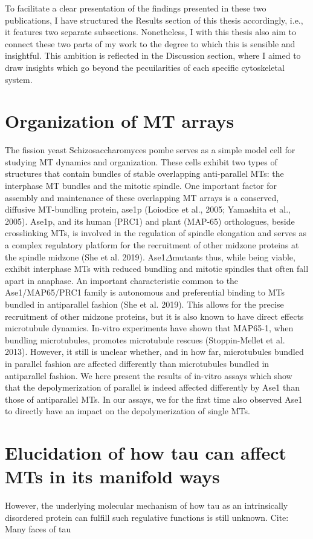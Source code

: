 To facilitate a clear presentation of the findings presented in these two publications, I have structured the Results section of this thesis accordingly, i.e., it features two separate subsections. Nonetheless, I with this thesis also aim to connect these two parts of my work to the degree to which this is sensible and insightful. This ambition is reflected in the Discussion section, where I aimed to draw insights which go beyond the pecuilarities of each specific cytoskeletal system.


\section{Organization of MT arrays}
The fission yeast Schizosaccharomyces pombe serves as a simple model cell for studying MT dynamics and organization. These cells exhibit two types of structures that contain bundles of stable overlapping anti-parallel MTs: the interphase MT bundles and the mitotic spindle. One important factor for assembly and maintenance of these overlapping MT arrays is a conserved, diffusive MT-bundling protein, ase1p (Loiodice et al., 2005; Yamashita et al., 2005). Ase1p, and its human (PRC1) and plant (MAP-65) orthologues, beside crosslinking MTs, is involved in the regulation of spindle elongation and serves as a complex regulatory platform for the recruitment of other midzone proteins at the spindle midzone (She et al. 2019). Ase1$\Delta$mutants thus, while being viable, exhibit interphase MTs with reduced bundling and mitotic spindles that often fall apart in anaphase. 
An important characteristic common to the Ase1/MAP65/PRC1 family is autonomous and preferential binding to MTs bundled in antiparallel fashion (She et al. 2019). This allows for the precise recruitment of other midzone proteins, but it is also known to have direct effects microtubule dynamics.  In-vitro experiments have shown that MAP65-1, when bundling microtubules, promotes microtubule rescues (Stoppin-Mellet et al. 2013). However, it still is unclear whether, and in how far, microtubules bundled in parallel fashion are affected differently than microtubules bundled in antiparallel fashion. 
We here present the results of in-vitro assays which show that the depolymerization of parallel is indeed affected differently by Ase1 than those of antiparallel MTs. In our assays, we for the first time also observed Ase1 to directly have an impact on the depolymerization of single MTs. 

\section{Elucidation of how tau can affect MTs in its manifold ways}
However, the underlying molecular mechanism of how tau as an intrinsically disordered protein can fulfill such regulative functions is still unknown. Cite: Many faces of tau